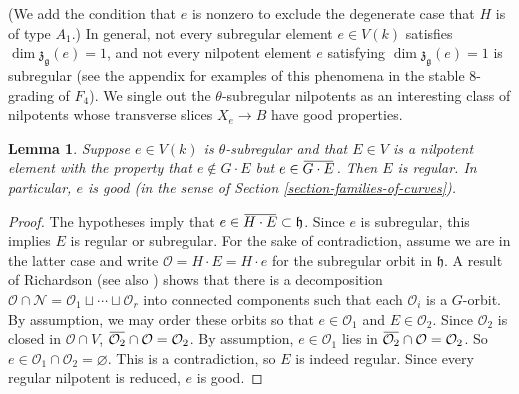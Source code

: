 \documentclass{article} %
\newtheorem{lemma}[proposition]{Lemma}
\numberwithin{equation}{section}
\theoremstyle{definition}
\renewcommand{\O}{\mathcal{O}}
\newcommand{\overbar}[1]{\mkern 1.5mu\overline{\mkern-1.5mu#1\mkern-1.5mu}\mkern 1.5mu}
\newcommand{\calO}{\mathcal{O}}
\newcommand{\frakg}{\mathfrak g}
\newcommand{\frakh}{\mathfrak h}
\newcommand{\frakz}{\mathfrak z}
\begin{document}
(We add the condition that $e$ is nonzero to exclude the degenerate case that $H$ is of type $A_1$.)
In general, not every subregular element $e\in V(k)$ satisfies $\dim \frakz_{\frakg}(e)=1$, and not every nilpotent element $e$ satisfying $\dim \frakz_{\frakg}(e)=1$ is subregular (see the appendix for examples of this phenomena in the stable $8$-grading of $F_4$).
We single out the $\theta$-subregular nilpotents as an interesting class of nilpotents whose transverse slices $X_e\rightarrow B$ have good properties.


\begin{lemma}
    Suppose $e\in V(k)$ is $\theta$-subregular and that $E\in V$ is a nilpotent element with the property that $e\not\in G\cdot E$ but $e\in \overbar{G\cdot E}$.
    Then $E$ is regular.
    In particular, $e$ is good (in the sense of Section \ref{section-families-of-curves}).
\end{lemma}
\begin{proof}
    The hypotheses imply that $e\in \overbar{H\cdot E}\subset \frakh$.
    Since $e$ is subregular, this implies $E$ is regular or subregular. 
    For the sake of contradiction, assume we are in the latter case and write $\calO = H\cdot E = H\cdot e$ for the subregular orbit in $\frakh$.
    A result of Richardson \cite[Lemma 3.1]{Richardson-orbitsofalgebraicgroups} (see also \cite[Section 2.3]{Vinberg-theweylgroupofgraded}) shows that there is a decomposition $\calO \cap \mathcal{N} = \calO_1\sqcup \cdots \sqcup \calO_r$ into connected components such that each $\calO_i$ is a $G$-orbit.
    By assumption, we may order these orbits so that $e\in \calO_1$ and $E\in \calO_2$.
    Since $\calO_2$ is closed in $\calO\cap V$, $\overbar{\calO_2}\cap \calO = \calO_2$. 
    By assumption, $e\in \calO_1$ lies in $\overbar{\O_2} \cap \O = \O_2$.
    So $e\in \calO_1\cap \calO_2 = \varnothing$.
    This is a contradiction, so $E$ is indeed regular.
    Since every regular nilpotent is reduced, $e$ is good.
\end{proof}
\end{document}
